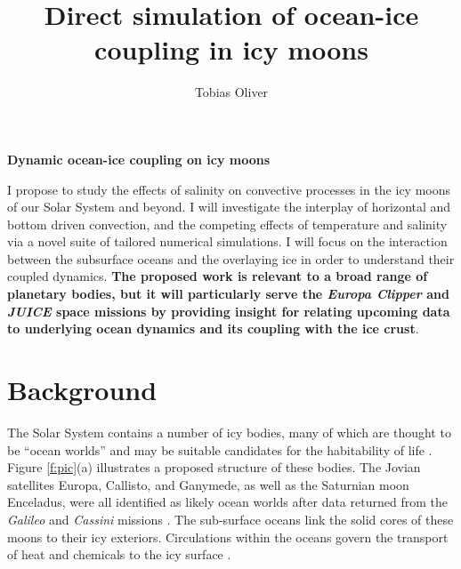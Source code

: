 \documentclass[12pt]{article}
\title{Direct simulation of ocean-ice coupling in icy moons}
\author{Tobias Oliver}
\date{}
\begin{document}
\pagestyle{fancy}
\thispagestyle{fancy}
\fancyhf{} %
\fancyhead[L]{\textcolor{red}{Tobias Oliver\\
Research Proposal}}
\fancyfoot[R]{\thepage}
\newcommand{\citep}[1]{\cite{#1}}
\begin{center}
\large{\textbf{Dynamic ocean-ice coupling on icy moons}}
\end{center}

I propose to study the effects of salinity on convective processes in the icy moons of our Solar System and beyond. 
I will investigate the interplay of horizontal and bottom driven convection, and the competing effects of temperature and salinity via a novel suite of tailored numerical simulations. 
I will focus on the interaction between the subsurface oceans and the overlaying ice in order to understand their coupled dynamics. 
\textbf{The proposed work is relevant to a broad range of planetary bodies, but it will particularly serve the \textit{Europa Clipper} and \textit{JUICE} space missions by providing insight for relating upcoming data to underlying ocean dynamics and its coupling with the ice crust}.

\section{Background}
The Solar System contains a number of icy bodies, many of which are thought to be ``ocean worlds'' and may be suitable candidates for the habitability of life \citep{tB24}.
Figure \ref{f:pic}(a) illustrates a proposed structure of these bodies. 
The Jovian satellites Europa, Callisto, and Ganymede, as well as the Saturnian moon Enceladus, were all identified as likely ocean worlds after data returned from the \textit{Galileo} and \textit{Cassini} missions \citep{fN16}.
The sub-surface oceans link the solid cores of these moons to their icy exteriors. Circulations within the oceans govern the transport of heat and chemicals to the icy surface \citep{kS20}. 
\end{document}
